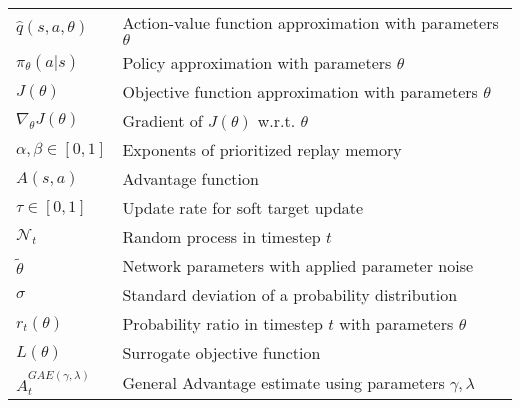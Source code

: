 \begin{longtable}{p{} p{}}
  $\hat{q}(s,a, \theta)$ & Action-value function approximation with parameters $\theta$\\
  $\pi_\theta(a|s)$ & Policy approximation with parameters $\theta$\\
  $J(\theta)$ & Objective function approximation with parameters $\theta$\\
  $\nabla_{\theta}J(\theta)$ & Gradient of $J(\theta)$ w.r.t. $\theta$\\
  $\alpha, \beta \in [0,1]$ & Exponents of prioritized replay memory\\
  $A(s,a)$ & Advantage function\\
  $\tau \in [0,1]$ & Update rate for soft target update\\
  $\mathcal{N}_t$ & Random process in timestep $t$\\
  $\widetilde \theta$ & Network parameters with applied parameter noise\\
  $\sigma$ & Standard deviation of a probability distribution\\
  $r_t(\theta)$ & Probability ratio in timestep $t$ with parameters $\theta$\\
  $L(\theta)$ & Surrogate objective function\\
  $\hat{A}_t^{GAE(\gamma,\lambda)}$ & General Advantage estimate using parameters $\gamma,\lambda$\\


\end{longtable}
\egroup

